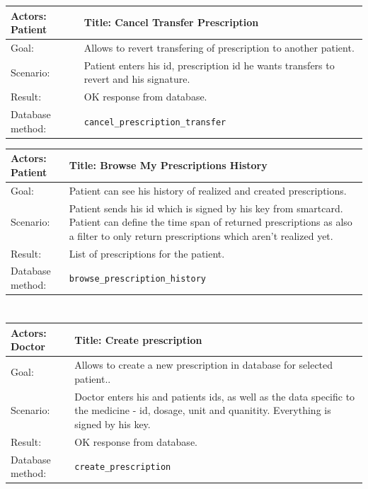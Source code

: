     \begin{longtable}{| p{6cm} | p{7.75cm} |}
    \hline
    Actors: Patient &Title: Cancel Transfer Prescription \\ \hline
    Goal: & Allows to revert transfering of prescription to another patient. \\ \hline
    Scenario: & Patient enters his id, prescription id he wants transfers to revert and his signature. \\ \hline
    Result: & OK response from database. \\ \hline
    Database  method: & \texttt{cancel\_prescription\_transfer} \\ \hline
\end{longtable}

    \begin{longtable}{| p{6cm} | p{7.75cm} |}
    \hline
    Actors: Patient &Title: Browse My Prescriptions History \\ \hline
    Goal: & Patient can see his history of realized and created prescriptions.\\ \hline
    Scenario: & Patient sends his id which is signed by his key from smartcard. Patient can define the time span of returned prescriptions as also a filter to only return prescriptions which aren't realized yet. \\ \hline
    Result: & List of prescriptions for the patient. \\ \hline
    Database  method: & \texttt{browse\_prescription\_history} \\ \hline

\end{longtable}

\normalsize
\newpage
\section{}

\small
    \begin{longtable}{| p{6cm} | p{7.75cm} |}
    \hline
   Actors:  Doctor &Title: Create prescription \\ \hline
    Goal: & Allows to create a new prescription in database for selected patient..\\ \hline
    Scenario: & Doctor enters his and patients ids, as well as the data specific to the medicine - id, dosage, unit and quanitity. Everything is signed by his key. \\ \hline
    Result: & OK response from database. \\ \hline
    Database  method: & \texttt{create\_prescription} \\ \hline
    \end{longtable}



